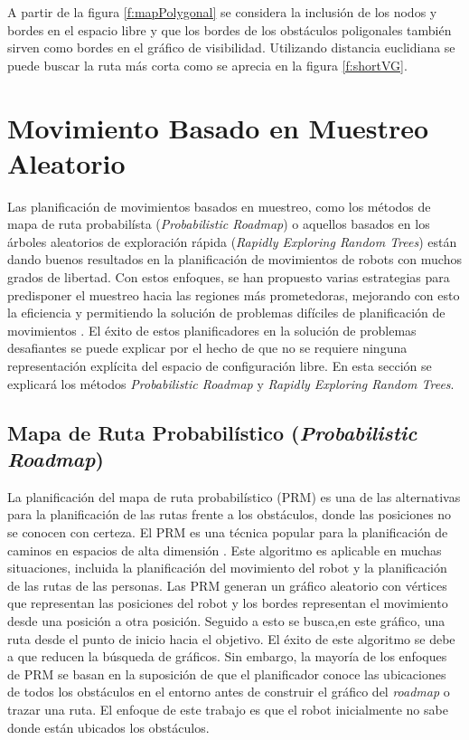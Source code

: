 A partir de la figura \ref{f:mapPolygonal} se considera la inclusi\'on de 
los nodos y bordes en el espacio libre y que los bordes de los obst\'aculos 
poligonales tambi\'en sirven como bordes en el gr\'afico de 
visibilidad. Utilizando distancia euclidiana se puede buscar la ruta m\'as 
corta como se aprecia en la figura \ref{f:shortVG}.

\section{Movimiento Basado en Muestreo Aleatorio}

Las planificaci\'on de movimientos basados en muestreo, como los m\'etodos 
de mapa de ruta probabil\'ista (\textit{Probabilistic Roadmap}) o aquellos 
basados en los \'arboles aleatorios de exploraci\'on r\'apida 
(\textit{Rapidly Exploring Random Trees}) est\'an dando buenos resultados 
en la planificaci\'on de movimientos de robots con muchos grados de 
libertad. Con estos enfoques, se han propuesto varias estrategias para 
predisponer el muestreo hacia las regiones m\'as prometedoras, mejorando 
con esto la eficiencia y permitiendo la soluci\'on de problemas dif\'iciles 
de planificaci\'on de movimientos \cite{elbanhawi2014sampling}. El \'exito 
de estos planificadores en la soluci\'on de problemas desafiantes se puede 
explicar por el hecho de que no se requiere ninguna representaci\'on 
expl\'icita del espacio de configuraci\'on libre. En esta secci\'on se 
explicar\'a los m\'etodos \textit{Probabilistic Roadmap} y \textit{Rapidly 
Exploring Random Trees}.

\subsection{Mapa de Ruta Probabil\'istico (\textit{Probabilistic Roadmap})}

La planificaci\'on del mapa de ruta probabil\'istico (PRM) es una de las 
alternativas para la planificaci\'on de las rutas frente a los  
obst\'aculos, donde las posiciones no se conocen con certeza. El PRM es una 
t\'ecnica popular para la planificaci\'on de caminos en espacios de alta 
dimensi\'on \cite{guibas1999probabilistic}. Este algoritmo es aplicable 
en muchas situaciones, incluida la planificaci\'on del movimiento del 
robot y la planificaci\'on de las rutas de las personas. Las PRM generan 
un gr\'afico aleatorio con v\'ertices que representan las posiciones del 
robot y los bordes representan el movimiento desde una posici\'on a otra 
posici\'on. Seguido a esto se busca,en este gr\'afico, una ruta desde el 
punto de inicio hacia el objetivo. El \'exito de este algoritmo se debe 
a que reducen la b\'usqueda de gr\'aficos. Sin embargo, la mayor\'ia de 
los enfoques de PRM se basan en la suposici\'on de que el planificador 
conoce las ubicaciones de todos los obst\'aculos en el entorno antes de 
construir el gr\'afico del \textit{roadmap} o trazar una ruta. El enfoque 
de este trabajo es que el robot inicialmente no sabe donde est\'an 
ubicados los obst\'aculos.

